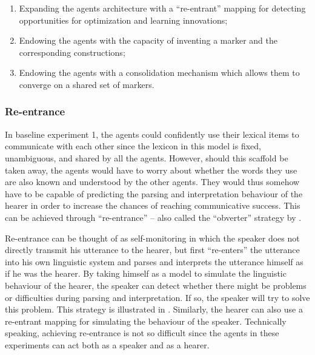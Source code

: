\begin{enumerate}
\item Expanding the agents architecture with a ``re-entrant'' mapping for detecting opportunities for optimization and learning innovations;
\item Endowing the agents with the capacity of inventing a marker and the corresponding constructions;
\item Endowing the agents with a consolidation mechanism which allows them to converge on a shared set of markers.  
\end{enumerate}

\subsubsection{Re-entrance}
 In baseline experiment 1, the agents could confidently use their lexical items to communicate with each other since the lexicon in this model is fixed, unambiguous, and shared by all the agents. However, should this scaffold be taken away, the agents would have to worry about whether the words they use are also known and understood by the other agents. They would thus somehow have to be capable of predicting the parsing and interpretation behaviour of the hearer in order to increase the chances of reaching communicative success. This can be achieved through ``re-entrance'' 
\citep{steels03language} -- also called the ``obverter'' strategy by \citet{smith03intelligent}.

Re-entrance can be thought of as self-monitoring in which the speaker does not directly transmit his utterance to the hearer, but first ``re-enters'' the utterance into his own linguistic system and parses and interprets the utterance himself as if he was the hearer. By taking himself as a model to simulate the linguistic behaviour of the hearer, the speaker can detect whether there might be problems or difficulties during parsing and interpretation. If so, the speaker will try to solve this problem. This strategy is illustrated in . Similarly, the hearer can also use a re-entrant mapping for simulating the behaviour of the speaker. Technically speaking, achieving re-entrance is not so difficult since the agents in these experiments can act both as a speaker and as a hearer.


